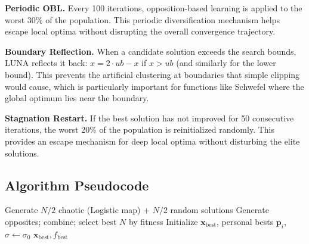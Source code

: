 \documentclass[11pt,a4paper]{article}
\begin{document}
\textbf{Periodic OBL.} Every 100 iterations, opposition-based learning is applied to the worst 30\% of the population. This periodic diversification mechanism helps escape local optima without disrupting the overall convergence trajectory.

\textbf{Boundary Reflection.} When a candidate solution exceeds the search bounds, LUNA reflects it back: $x = 2 \cdot ub - x$ if $x > ub$ (and similarly for the lower bound). This prevents the artificial clustering at boundaries that simple clipping would cause, which is particularly important for functions like Schwefel where the global optimum lies near the boundary.

\textbf{Stagnation Restart.} If the best solution has not improved for 50 consecutive iterations, the worst 20\% of the population is reinitialized randomly. This provides an escape mechanism for deep local optima without disturbing the elite solutions.

\subsection{Algorithm Pseudocode}

\begin{algorithm}[H]
\SetAlgoLined
{}
\BlankLine
{}
Generate $N/2$ chaotic (Logistic map) + $N/2$ random solutions\;
Generate opposites; combine; select best $N$ by fitness\;
Initialize $\mathbf{x}_{\text{best}}$, personal bests $\mathbf{p}_i$, $\sigma \gets \sigma_0$\;
\BlankLine
{}
\Return $\mathbf{x}_{\text{best}}, f_{\text{best}}$\;
\caption{LUNA --- Lunar-inspired Update \& Navigation Algorithm}
\label{alg:luna}
\end{algorithm}
\end{document}

